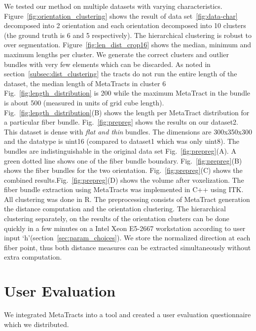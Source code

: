 We tested our method on multiple datasets with varying characteristics. 
Figure~\ref{fig:orientation_clustering} shows the result of data set~\ref{fig:data-char} decomposed into 2 orientation and each orientation decomposed into 10 clusters (the ground truth is 6 and 5 respectively). The hierarchical clustering is robust to over segmentation.
Figure~\ref{fig:len_dist_crop16} shows the median, minimum and maximum lengths per cluster. We generate the correct clusters and outlier bundles with very few elements which can be discarded. As noted in section~\ref{subsec:dist_clustering} the tracts do not run the entire length of the dataset, the median length of MetaTracts in cluster 6 Fig.~\ref{fig:length_distribution} is 200 while the maximum MetaTract in the bundle is about 500 (measured in units of grid cube length). Fig.~\ref{fig:length_distribution}(B) shows the length per MetaTract distribution for a particular fiber bundle. 
Fig.~\ref{fig:prepreg} shows the results on our dataset2. This dataset is dense with \textit{flat and thin} bundles. The dimensions are 300x350x300 and the datatype is uint16 (compared to dataset1 which was only uint8). The bundles are indistinguishable in the original data set Fig.~\ref{fig:prepreg}(A). A green dotted line shows one of the fiber bundle boundary. Fig.~\ref{fig:prepreg}(B) shows the fiber bundles for the two orientation. Fig.~\ref{fig:prepreg}(C) shows the combined results.Fig.~\ref{fig:prepreg}(D) shows the volume after voxelization.
The fiber bundle extraction using MetaTracts was implemented in C++ using ITK. All clustering was done in R. The preprocessing consists of MetaTract generation the distance computation and the orientation clustering. The hierarchical clustering separately, on the results of the orientation clusters can be done quickly in a few minutes on a Intel Xeon E5-2667 workstation according to user input `h'(section~\ref{sec:param_choices}). We store the normalized direction at each fiber point, thus both distance measures can be extracted simultaneously without extra computation.


\section {User Evaluation}
\label {sec:evaluation}
We integrated MetaTracts into a tool and created a user evaluation questionnaire which we distributed.


